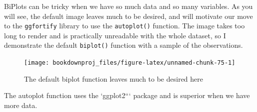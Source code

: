 \documentclass[
]{article}
\newenvironment{Shaded}{\begin{snugshade}}{\end{snugshade}}
\newcommand{\AttributeTok}[1]{\textcolor[rgb]{0.77,0.63,0.00}{#1}}
\newcommand{\ConstantTok}[1]{\textcolor[rgb]{0.00,0.00,0.00}{#1}}
\newcommand{\DecValTok}[1]{\textcolor[rgb]{0.00,0.00,0.81}{#1}}
\newcommand{\FloatTok}[1]{\textcolor[rgb]{0.00,0.00,0.81}{#1}}
\newcommand{\FunctionTok}[1]{\textcolor[rgb]{0.00,0.00,0.00}{#1}}
\newcommand{\NormalTok}[1]{#1}
\newcommand{\SpecialCharTok}[1]{\textcolor[rgb]{0.00,0.00,0.00}{#1}}
\newcommand{\StringTok}[1]{\textcolor[rgb]{0.31,0.60,0.02}{#1}}
\theoremstyle{definition}
\theoremstyle{definition}
\theoremstyle{definition}
\theoremstyle{definition}
\theoremstyle{remark}
\begin{document}
BiPlots can be tricky when we have so much data and so many variables. As you will see, the default image leaves much to be desired, and will motivate our move to the \texttt{ggfortify} library to use the \texttt{autoplot()} function. The image takes too long to render and is practically unreadable with the whole dataset, so I demonstrate the default \texttt{biplot()} function with a sample of the observations.



\begin{Shaded}
\end{Shaded}

\begin{figure}

{\centering \texttt{[image: bookdownproj\_files/figure-latex/unnamed-chunk-75-1]} 

}

\caption{The default biplot function leaves much to be desired here}\label{fig:unnamed-chunk-75}
\end{figure}

The autoplot function uses the `ggplot2``` package and is superior when we have more data.



\begin{Shaded}
\end{Shaded}
\end{document}
